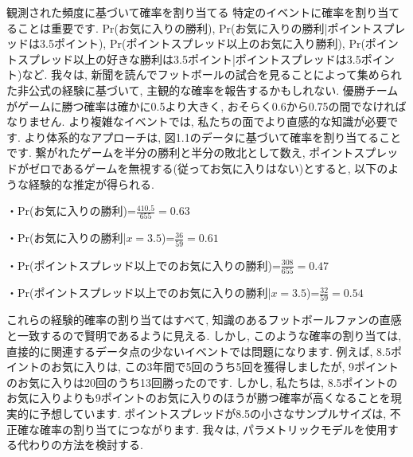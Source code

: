 \documentclass[10pt,dvipdfmx,a4]{beamer}
\begin{document}
\begin{frame}{観測された頻度に基づいて確率を割り当てる}
特定のイベントに確率を割り当てることは重要です.
$\text{Pr}$(お気に入りの勝利), $\text{Pr}$(お気に入りの勝利|ポイントスプレッドは3.5ポイント), $\text{Pr}$(ポイントスプレッド以上のお気に入り勝利), $\text{Pr}$(ポイントスプレッド以上の好きな勝利は3.5ポイント|ポイントスプレッドは3.5ポイント)など.
我々は, 新聞を読んでフットボールの試合を見ることによって集められた非公式の経験に基づいて, 主観的な確率を報告するかもしれない.
優勝チームがゲームに勝つ確率は確かに0.5より大きく, おそらく0.6から0.75の間でなければなりません.
より複雑なイベントでは, 私たちの面でより直感的な知識が必要です.
より体系的なアプローチは, 図1.1のデータに基づいて確率を割り当てることです.
繋がれたゲームを半分の勝利と半分の敗北として数え, ポイントスプレッドがゼロであるゲームを無視する(従ってお気に入りはない)とすると, 以下のような経験的な推定が得られる.

・$\text{Pr}$(お気に入りの勝利)=$\tfrac{410.5}{655}=0.63$

・$\text{Pr}$(お気に入りの勝利|$x=3.5$)=$\tfrac{36}{59}=0.61$

・$\text{Pr}$(ポイントスプレッド以上でのお気に入りの勝利)=$\tfrac{308}{655}=0.47$

・$\text{Pr}$(ポイントスプレッド以上でのお気に入りの勝利|$x=3.5$)=$\tfrac{32}{59}=0.54$
\end{frame}


\begin{frame}
これらの経験的確率の割り当てはすべて, 知識のあるフットボールファンの直感と一致するので賢明であるように見える.
しかし, このような確率の割り当ては, 直接的に関連するデータ点の少ないイベントでは問題になります.
例えば, 8.5ポイントのお気に入りは, この3年間で5回のうち5回を獲得しましたが, 9ポイントのお気に入りは20回のうち13回勝ったのです.
しかし, 私たちは, 8.5ポイントのお気に入りよりも9ポイントのお気に入りのほうが勝つ確率が高くなることを現実的に予想しています.
ポイントスプレッドが8.5の小さなサンプルサイズは, 不正確な確率の割り当てにつながります.
我々は, パラメトリックモデルを使用する代わりの方法を検討する.
\end{frame}

\end{document}
